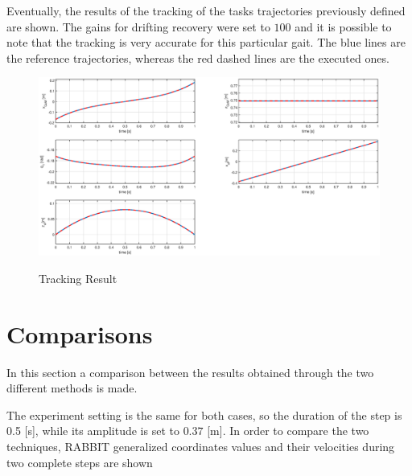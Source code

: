 \documentclass[11pt]{article}
\begin{document}
Eventually, the results of the tracking of the tasks trajectories previously defined are shown. The gains for drifting recovery were set to $100$ and it is possible to note that the tracking is very accurate for this particular gait. The blue lines are the reference trajectories, whereas the red dashed lines are the executed ones.
\begin{figure}[H]
\includegraphics[width=1\linewidth]{Images/tracking_2_steps_1_sec.eps}
\label{fig:trajectory_tracking}
\caption{Tracking Result}
\end{figure}

\newpage
\section{Comparisons}

In this section a comparison between the results obtained through the two different methods is made.

The experiment setting is the same for both cases, so the duration of the step is 0.5 [s], while its amplitude is set to $0.37$ [m]. In order to compare the two techniques, RABBIT generalized coordinates values and their velocities during two complete steps are shown 
\end{document}
